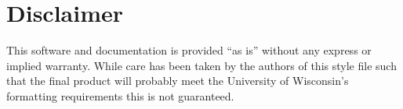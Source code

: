 \section{Disclaimer}
This software and documentation is provided ``as is'' without any
express or implied warranty.
While care has been taken by the authors of this style file such that the
final product will probably meet the University of Wisconsin's formatting 
requirements this is not guaranteed. 
